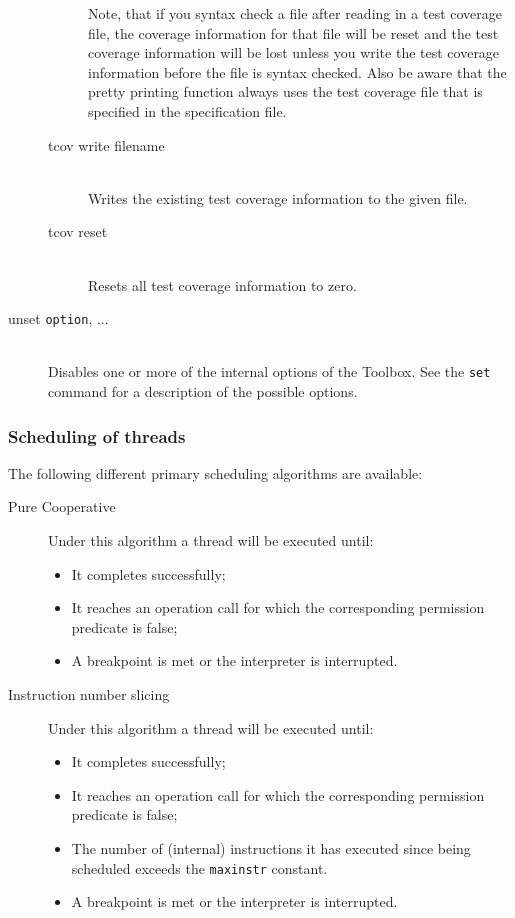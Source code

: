 \documentclass[\pformat,12pt]{article}
\newcommand{\Toolbox}{Toolbox}
\begin{document}
\begin{description}
\begin{description}
    Note, that if you syntax check a file after reading in a test coverage 
    file, the coverage information for that file will be reset and the test coverage
    information will be lost unless you write the test coverage information
    before the file is syntax checked.
    Also be aware that the pretty printing function always uses the test coverage
    file that is specified in the specification file.

  \item[tcov write filename]\mbox{} \\
    Writes the existing test coverage information to the given file.
  
  \item[tcov reset]\mbox{} \\
    Resets all test coverage information to zero.
  \end{description}

  
\item[unset {\tt option}, ...]\mbox{}\\
  Disables one or more of the internal options of the \Toolbox. See the
  {\tt set} command for a description of the possible options.


\end{description}


\subsubsection{Scheduling of threads}\label{subsec:scheduling}

The following different primary scheduling algorithms are available:

\begin{description}

\item[Pure Cooperative] Under this algorithm a thread will be executed
until:
\begin{itemize}
\item It completes successfully;
\item It reaches an operation call for which the corresponding
permission predicate is false;
\item A breakpoint is met or the interpreter is interrupted.
\end{itemize}
\item[Instruction number slicing] Under this algorithm a thread will
be executed until:
\begin{itemize}
\item It completes successfully;
\item It reaches an operation call for which the corresponding
permission predicate is false;
\item The number of (internal) instructions it has executed since
being scheduled exceeds the \texttt{maxinstr} constant.
\item A breakpoint is met or the interpreter is interrupted.
\end{itemize}




\end{description}
\end{document}
